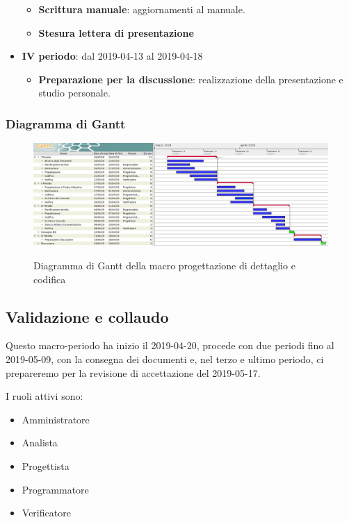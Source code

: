 \begin{itemize}
\begin{itemize}
    	        \item \textbf{Scrittura manuale}: aggiornamenti al manuale.
    	        \item \textbf{Stesura lettera di presentazione}
        	\end{itemize}
        	\item \textbf{IV periodo}: dal 2019-04-13 al 2019-04-18
			\begin{itemize}
				\item \textbf{Preparazione per la discussione}: realizzazione della presentazione e studio personale.
        	\end{itemize}
        \end{itemize}

        \begin{landscape}
			\subsubsection{Diagramma di Gantt}
			\begin{figure}[H]
					\centering
					\includegraphics[scale=0.44]{img/Progettazione_di_dettaglio_e_codifica.png}\\
					\caption{Diagramma di Gantt della macro progettazione di dettaglio e codifica}
			\end{figure}
		\end{landscape}
		\newpage

        \subsection{Validazione e collaudo}
		Questo macro-periodo ha inizio il 2019-04-20, procede con due periodi fino al 2019-05-09, con la consegna dei documenti e, nel terzo e ultimo periodo,
		ci prepareremo per la revisione di accettazione del 2019-05-17.

        I ruoli attivi sono:
        \begin{itemize}
            \item Amministratore
            \item Analista
            \item Progettista
            \item Programmatore
            \item Verificatore
		\end{itemize}

